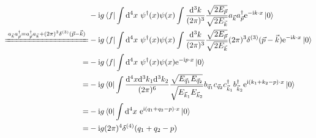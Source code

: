 \documentclass{article}
\begin{document}
$$
  \begin{aligned}
                                                                                                                         & -\mathrm{i}g\left\langle f\right|\int\mathrm{d}^4x\ \psi^{\dagger}(x)\psi(x)\int\frac{\mathrm{d}^3k}{(2\pi)^3}\frac{\sqrt{2E_{\vec{p}}}}{\sqrt{2E_{\vec{k}}}}a_{\vec{k}}a_{\vec{p}}^{\dagger}\mathrm{e}^{-\mathrm{i}k\cdot x}\left|0\right\rangle                                                                     \\
    \xlongequal{a_{\vec{k}}a_{\vec{p}}^{\dagger}=a_{\vec{p}}^{\dagger}a_{\vec{k}}+(2\pi)^3\delta^{(3)}(\vec{p}-\vec{k})} & -\mathrm{i}g\left\langle f\right|\int\mathrm{d}^4x\ \psi^{\dagger}(x)\psi(x)\int\frac{\mathrm{d}^3k}{(2\pi)^3}\frac{\sqrt{2E_{\vec{p}}}}{\sqrt{2E_{\vec{k}}}}(2\pi)^3\delta^{(3)}(\vec{p}-\vec{k})\mathrm{e}^{-\mathrm{i}k\cdot x}\left|0\right\rangle                                                                \\
    =                                                                                                                    & -\mathrm{i}g\left\langle f\right|\int\mathrm{d}^4x\ \psi^{\dagger}(x)\psi(x)\mathrm{e}^{-\mathrm{i}p\cdot x}\left|0\right\rangle                                                                                                                                                                                      \\
    =                                                                                                                    & -\mathrm{i}g\left\langle 0\right|\int\frac{\mathrm{d}^4x\mathrm{d}^3k_{1}\mathrm{d}^3k_{2}}{(2\pi)^6}\frac{\sqrt{E_{\vec{q}_1}E_{\vec{q}_2}}}{\sqrt{E_{\vec{k}_1}E_{\vec{k}_2}}}b_{\vec{q}_1}c_{\vec{q}_2}c_{\vec{k}_1}^{\dagger}b_{\vec{k}_2}^{\dagger}\mathrm{e}^{\mathrm{i}(k_1+k_2-p)\cdot x}\left|0\right\rangle \\
    =                                                                                                                    & -\mathrm{i}g\left\langle 0\right|\int\mathrm{d}^4x\ \mathrm{e}^{\mathrm{i}(q_1+q_2-p)\cdot x}\left|0\right\rangle                                                                                                                                                                                                     \\
    =                                                                                                                    & -\mathrm{i}g(2\pi)^4\delta^{(4)}(q_1+q_2-p)
  \end{aligned}
$$
\end{document}
